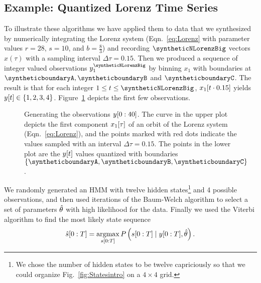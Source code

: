 \subsection{Example: Quantized Lorenz Time Series}
\label{sec:QuantizedLorenz}

To illustrate these algorithms we have applied them to data that we
synthesized by numerically integrating the Lorenz system
(Eqn.~\eqref{eq:Lorenz} with parameter values $r=28$, $s=10$, and
$b=\frac{8}{3}$) and recording $\syntheticNLorenzBig$ vectors $x(\tau)$ with a
sampling interval $\Delta \tau = 0.15$.  Then we produced a sequence
of integer valued observations $y_1^{\syntheticNLorenzBig}$ by binning $x_1$
with boundaries at $\syntheticboundaryA,\syntheticboundaryB$ and $\syntheticboundaryC$.  The
result is that for each integer $1\leq t \leq \syntheticNLorenzBig$,
${x_1}{[t\cdot0.15]}$ yields ${y}{[t]} \in \left\{1,2,3,4\right\}$.
Figure~\ref{fig:TSintro} depicts the first few observations.

\begin{figure}[htbp]
  \caption[Generating the observations
  $\ts{y}{0}{40}$.]%
  {Generating the observations $\ts{y}{0}{40}$.  The curve in the
    upper plot depicts the first component ${x_1}{[\tau]}$ of an
    orbit of the Lorenz system (Eqn.~\ref{eq:Lorenz}), and the points
    marked with red dots indicate the values sampled with an interval
    $\Delta \tau = 0.15$.  The points in the lower plot are the
    ${y}{[t]}$ values quantized with boundaries
    $\left\{\syntheticboundaryA, \syntheticboundaryB, \syntheticboundaryC\right\}$.  }
  \label{fig:TSintro} 
\end{figure}
 
We randomly generated an HMM with twelve hidden states\footnote{We
  chose the number of hidden states to be twelve capriciously so that
  we could organize Fig.~\ref{fig:Statesintro} on a $4\times 4$ grid.}
and 4 possible observations, and then used \syntheticLorenzTrainingIterations
iterations of the Baum-Welch algorithm to select a set of parameters
$\hat {\theta}$ with high likelihood for the data.  Finally we used
the Viterbi algorithm to find the most likely state sequence
 \begin{equation*}
   {\hat s[0:T]} = \operatorname*{argmax}_{s[0:T]}P
   \left(s[0:T]\mid y[0:T], \hat {\theta} \right).
 \end{equation*}
 
